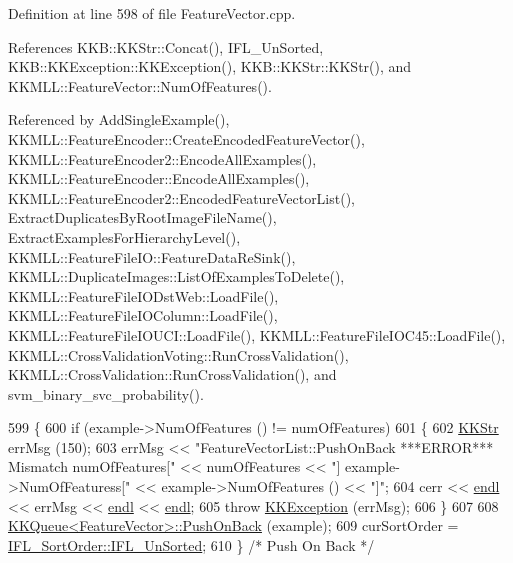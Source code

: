 Definition at line 598 of file Feature\+Vector.\+cpp.



References K\+K\+B\+::\+K\+K\+Str\+::\+Concat(), I\+F\+L\+\_\+\+Un\+Sorted, K\+K\+B\+::\+K\+K\+Exception\+::\+K\+K\+Exception(), K\+K\+B\+::\+K\+K\+Str\+::\+K\+K\+Str(), and K\+K\+M\+L\+L\+::\+Feature\+Vector\+::\+Num\+Of\+Features().



Referenced by Add\+Single\+Example(), K\+K\+M\+L\+L\+::\+Feature\+Encoder\+::\+Create\+Encoded\+Feature\+Vector(), K\+K\+M\+L\+L\+::\+Feature\+Encoder2\+::\+Encode\+All\+Examples(), K\+K\+M\+L\+L\+::\+Feature\+Encoder\+::\+Encode\+All\+Examples(), K\+K\+M\+L\+L\+::\+Feature\+Encoder2\+::\+Encoded\+Feature\+Vector\+List(), Extract\+Duplicates\+By\+Root\+Image\+File\+Name(), Extract\+Examples\+For\+Hierarchy\+Level(), K\+K\+M\+L\+L\+::\+Feature\+File\+I\+O\+::\+Feature\+Data\+Re\+Sink(), K\+K\+M\+L\+L\+::\+Duplicate\+Images\+::\+List\+Of\+Examples\+To\+Delete(), K\+K\+M\+L\+L\+::\+Feature\+File\+I\+O\+Dst\+Web\+::\+Load\+File(), K\+K\+M\+L\+L\+::\+Feature\+File\+I\+O\+Column\+::\+Load\+File(), K\+K\+M\+L\+L\+::\+Feature\+File\+I\+O\+U\+C\+I\+::\+Load\+File(), K\+K\+M\+L\+L\+::\+Feature\+File\+I\+O\+C45\+::\+Load\+File(), K\+K\+M\+L\+L\+::\+Cross\+Validation\+Voting\+::\+Run\+Cross\+Validation(), K\+K\+M\+L\+L\+::\+Cross\+Validation\+::\+Run\+Cross\+Validation(), and svm\+\_\+binary\+\_\+svc\+\_\+probability().


\begin{DoxyCode}
599 \{
600   \textcolor{keywordflow}{if}  (example->NumOfFeatures () != numOfFeatures)
601   \{
602     \hyperlink{class_k_k_b_1_1_k_k_str}{KKStr}  errMsg (150);
603     errMsg  << \textcolor{stringliteral}{"FeatureVectorList::PushOnBack   ***ERROR***   Mismatch numOfFeatures["} << numOfFeatures << \textcolor{stringliteral}{
      "] example->NumOfFeaturess["} << example->NumOfFeatures () << \textcolor{stringliteral}{"]"};
604     cerr << \hyperlink{namespace_k_k_b_ad1f50f65af6adc8fa9e6f62d007818a8}{endl} << errMsg << \hyperlink{namespace_k_k_b_ad1f50f65af6adc8fa9e6f62d007818a8}{endl} << \hyperlink{namespace_k_k_b_ad1f50f65af6adc8fa9e6f62d007818a8}{endl};
605     \textcolor{keywordflow}{throw} \hyperlink{class_k_k_b_1_1_k_k_exception}{KKException} (errMsg);
606   \}
607 
608   \hyperlink{class_k_k_b_1_1_k_k_queue}{KKQueue<FeatureVector>::PushOnBack} (example);
609   curSortOrder = \hyperlink{class_k_k_m_l_l_1_1_feature_vector_list_a24e87fc6e8ca10537dbcd275bb339a3ca0e3e88ff557d4664b67de1a03649c67a}{IFL\_SortOrder::IFL\_UnSorted};
610 \}  \textcolor{comment}{/* Push On Back */}
\end{DoxyCode}
